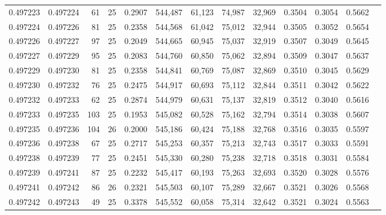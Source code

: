 \begin{tabular}{rrrrrrrrrrrrr}
0.497223 & 0.497224 &    61 &  25 &                                     0.2907 & 544,487 &  61,123 &  74,987 &  32,969 & 0.3504 & 0.3054 & 0.5662 \\
0.497224 & 0.497226 &    81 &  25 &                                     0.2358 & 544,568 &  61,042 &  75,012 &  32,944 & 0.3505 & 0.3052 & 0.5654 \\
0.497226 & 0.497227 &    97 &  25 &                                     0.2049 & 544,665 &  60,945 &  75,037 &  32,919 & 0.3507 & 0.3049 & 0.5645 \\
0.497227 & 0.497229 &    95 &  25 &                                     0.2083 & 544,760 &  60,850 &  75,062 &  32,894 & 0.3509 & 0.3047 & 0.5637 \\
0.497229 & 0.497230 &    81 &  25 &                                     0.2358 & 544,841 &  60,769 &  75,087 &  32,869 & 0.3510 & 0.3045 & 0.5629 \\
0.497230 & 0.497232 &    76 &  25 &                                     0.2475 & 544,917 &  60,693 &  75,112 &  32,844 & 0.3511 & 0.3042 & 0.5622 \\
0.497232 & 0.497233 &    62 &  25 &                                     0.2874 & 544,979 &  60,631 &  75,137 &  32,819 & 0.3512 & 0.3040 & 0.5616 \\
0.497233 & 0.497235 &   103 &  25 &                                     0.1953 & 545,082 &  60,528 &  75,162 &  32,794 & 0.3514 & 0.3038 & 0.5607 \\
0.497235 & 0.497236 &   104 &  26 &                                     0.2000 & 545,186 &  60,424 &  75,188 &  32,768 & 0.3516 & 0.3035 & 0.5597 \\
0.497236 & 0.497238 &    67 &  25 &                                     0.2717 & 545,253 &  60,357 &  75,213 &  32,743 & 0.3517 & 0.3033 & 0.5591 \\
0.497238 & 0.497239 &    77 &  25 &                                     0.2451 & 545,330 &  60,280 &  75,238 &  32,718 & 0.3518 & 0.3031 & 0.5584 \\
0.497239 & 0.497241 &    87 &  25 &                                     0.2232 & 545,417 &  60,193 &  75,263 &  32,693 & 0.3520 & 0.3028 & 0.5576 \\
0.497241 & 0.497242 &    86 &  26 &                                     0.2321 & 545,503 &  60,107 &  75,289 &  32,667 & 0.3521 & 0.3026 & 0.5568 \\
0.497242 & 0.497243 &    49 &  25 &                                     0.3378 & 545,552 &  60,058 &  75,314 &  32,642 & 0.3521 & 0.3024 & 0.5563 \\

\end{tabular}
